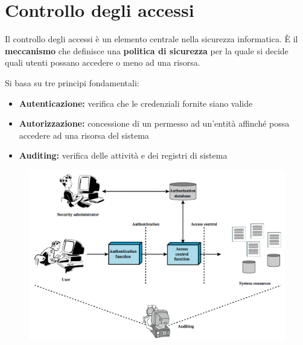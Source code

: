 \chapter{Controllo degli accessi}

Il controllo degli accessi è un elemento centrale nella sicurezza 
informatica. È il \textbf{meccanismo} che definisce una \textbf{politica 
di sicurezza} per la quale si decide quali utenti possano accedere o 
meno ad una risorsa.

\noindent Si basa su tre principi fondamentali:
\begin{itemize}
    \item \textbf{Autenticazione:} verifica che le credenziali fornite 
    siano valide 
    \item \textbf{Autorizzazione:} concessione di un permesso ad un'entità
    affinché possa accedere ad una risorsa del sistema 
    \item \textbf{Auditing:} verifica delle attività e dei registri di 
    sistema
\end{itemize}

\begin{figure}[H]
    \centering
    \includegraphics[width=1\linewidth]{chapters/3/images/ac.png}
\end{figure}
